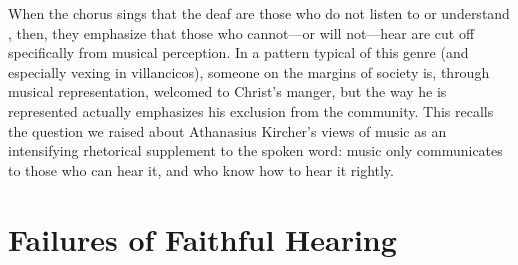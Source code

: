 When the chorus sings that the deaf are those who do not listen to or understand , then, they emphasize that those who cannot---or will not---hear are cut off specifically from musical perception.
In a pattern typical of this genre (and especially vexing in  villancicos), someone on the margins of society is, through musical representation, welcomed to Christ's manger, but the way he is represented actually emphasizes his exclusion from the community.
This recalls the question we raised about Athanasius Kircher's views of music as an intensifying rhetorical supplement to the spoken word: music only communicates to those who can hear it, and who know how to hear it rightly.

\section{Failures of Faithful Hearing}

